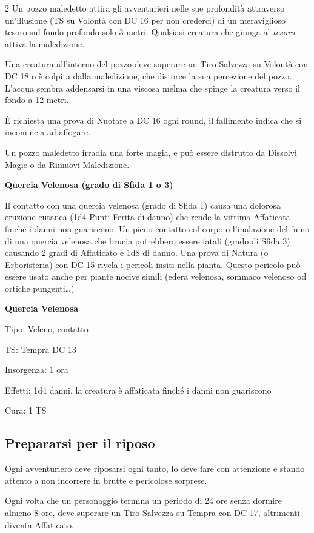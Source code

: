 \begin{multicols}{2}
Un pozzo maledetto attira gli avventurieri nelle sue profondità attraverso un'illusione (TS su Volontà con DC 16 per non crederci) di un meraviglioso tesoro sul fondo profondo solo 3 metri. Qualsiasi creatura che giunga al \emph{tesoro} attiva la maledizione.

Una creatura all'interno del pozzo deve superare un Tiro Salvezza su Volontà con DC 18 o è colpita dalla maledizione, che distorce la sua percezione del pozzo. L'acqua sembra addensarsi in una viscosa melma che spinge la creatura verso il fondo a 12 metri.

È richiesta una prova di Nuotare a DC 16 ogni round, il fallimento indica che si incomincia ad affogare.

Un pozzo maledetto irradia una forte magia, e può essere distrutto da Dissolvi Magie o da Rimuovi Maledizione.

\medskip
\textbf{Quercia Velenosa (grado di Sfida 1 o 3)}

Il contatto con una quercia velenosa (grado di Sfida 1) causa una dolorosa eruzione cutanea (1d4 Punti Ferita di danno) che rende la vittima Affaticata finché i danni non guariscono. Un pieno contatto col corpo o l'inalazione del fumo di una quercia velenosa che brucia potrebbero essere fatali (grado di Sfida 3) causando 2 gradi di Affaticato e 1d8 di danno.
Una prova di Natura (o Erboristeria) con DC 15 rivela i pericoli insiti nella pianta. Questo pericolo può essere usato anche per piante nocive simili (edera velenosa, sommaco velenoso od ortiche pungenti…)

\textbf{Quercia Velenosa}

Tipo: Veleno, contatto

TS: Tempra DC 13

Insorgenza: 1 ora

Effetti: 1d4 danni, la creatura è affaticata finché i danni non guariscono

Cura: 1 TS

\subsection{Prepararsi per il riposo}

Ogni avventuriero deve riposarsi ogni tanto, lo deve fare con attenzione e stando attento a non incorrere in brutte e pericolose sorprese.

Ogni volta che un personaggio termina un periodo di 24 ore senza dormire almeno 8 ore, deve superare un Tiro Salvezza su Tempra con DC 17, altrimenti diventa Affaticato.


\end{multicols}
